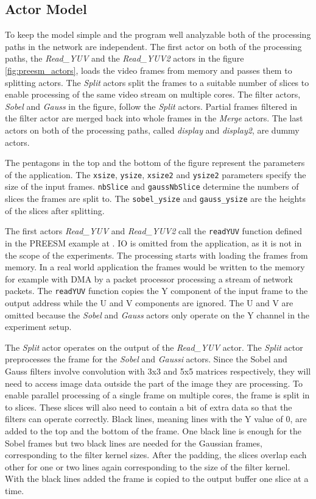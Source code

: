 \subsection{Actor Model}
\label{subsec:actors}
To keep the model simple and the program well analyzable both of the processing paths in the network are independent. The first actor on both of the processing paths, the \textit{Read\_YUV} and the \textit{Read\_YUV2} actors in the figure \ref{fig:preesm_actors}, loads the video frames from memory and passes them to splitting actors. The \textit{Split} actors split the frames to a suitable number of slices to enable processing of the same video stream on multiple cores. The filter actors, \textit{Sobel} and \textit{Gauss} in the figure, follow the \textit{Split} actors. Partial frames filtered in the filter actor are merged back into whole frames in the \textit{Merge} actors. The last actors on both of the processing paths, called \textit{display} and \textit{display2}, are dummy actors.

The pentagons in the top and the bottom of the figure represent the parameters of the application. The \texttt{xsize}, \texttt{ysize}, \texttt{xsize2} and \texttt{ysize2} parameters specify the size of the input frames. \texttt{nbSlice} and \texttt{gaussNbSlice} determine the numbers of slices the frames are split to. The \texttt{sobel\_ysize} and \texttt{gauss\_ysize} are the heights of the slices after splitting.

The first actors \textit{Read\_YUV} and \textit{Read\_YUV2} call the \texttt{readYUV} function defined in the PREESM example at \cite{preesmtut}. IO is omitted from the application, as it is not in the scope of the experiments. The processing starts with loading the frames from memory. In a real world application the frames would be written to the memory for example with DMA by a packet processor processing a stream of network packets. The \texttt{readYUV} function copies the Y component of the input frame to the output address while the U and V components are ignored. The U and V are omitted because the \textit{Sobel} and \textit{Gauss} actors only operate on the Y channel in the experiment setup.

The \textit{Split} actor operates on the output of the \textit{Read\_YUV} actor. The \textit{Split} actor preprocesses the frame for the \textit{Sobel} and \textit{Gaussi} actors. Since the Sobel and Gauss filters involve convolution with 3x3 and 5x5 matrices respectively, they will need to access image data outside the part of the image they are processing. To enable parallel processing of a single frame on multiple cores, the frame is split in to slices. These slices will also need to contain a bit of extra data so that the filters can operate correctly. Black lines, meaning lines with the Y value of 0, are added to the top and the bottom of the frame. One black line is enough for the Sobel frames but two black lines are needed for the Gaussian frames, corresponding to the filter kernel sizes. After the padding, the slices overlap each other for one or two lines again corresponding to the size of the filter kernel. With the black lines added the frame is copied to the output buffer one slice at a time.

